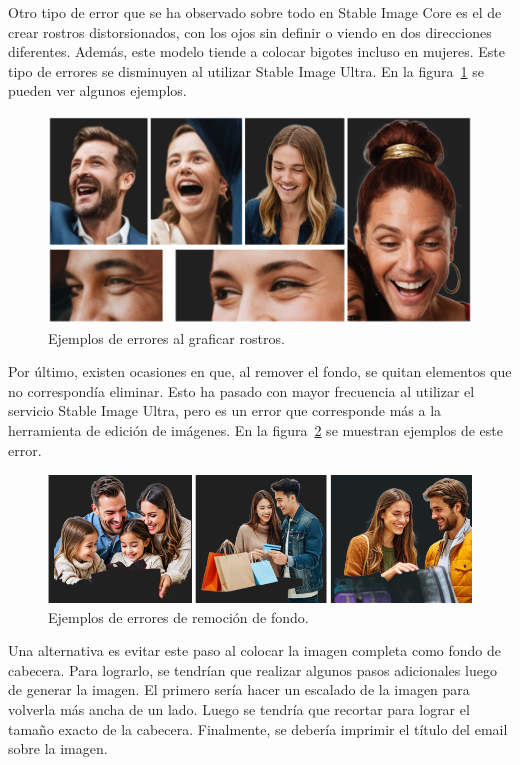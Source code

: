 Otro tipo de error que se ha observado sobre todo en Stable Image Core es el de crear rostros distorsionados, con los ojos sin definir o viendo en dos direcciones diferentes. Además, este modelo tiende a colocar bigotes incluso en mujeres. Este tipo de errores se disminuyen al utilizar Stable Image Ultra. En la figura~\ref{fig:erroresManos} se pueden ver algunos ejemplos.

\begin{figure}[H]
    \centering
    \includegraphics[width=1\linewidth]{Figures/erroresRostros.png}
    \caption{Ejemplos de errores al graficar rostros.}
    \label{fig:erroresManos}
\end{figure}

Por último, existen ocasiones en que, al remover el fondo, se quitan elementos que no correspondía eliminar. Esto ha pasado con mayor frecuencia al utilizar el servicio Stable Image Ultra, pero es un error que corresponde más a la herramienta de edición de imágenes. En la figura~\ref{fig:erroresFondo} se muestran ejemplos de este error.

\begin{figure}[H]
    \centering
    \includegraphics[width=1\linewidth]{Figures/erroresFondo.png}
    \caption{Ejemplos de errores de remoción de fondo.}
    \label{fig:erroresFondo}
\end{figure}

Una alternativa es evitar este paso al colocar la imagen completa como fondo de cabecera. Para lograrlo, se tendrían que realizar algunos pasos adicionales luego de generar la imagen. El primero sería hacer un escalado de la imagen para volverla más ancha de un lado. Luego se tendría que recortar para lograr el tamaño exacto de la cabecera. Finalmente, se debería imprimir el título del email sobre la imagen. 

